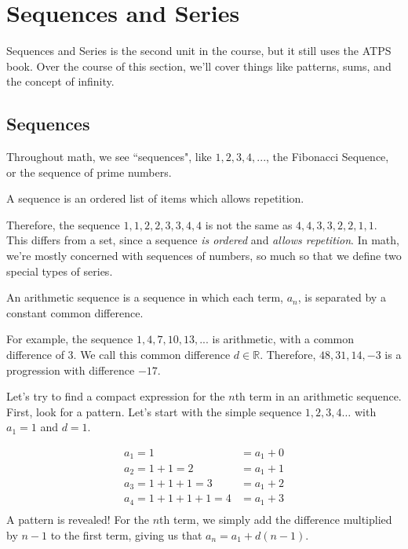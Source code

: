 \documentclass[11pt]{article}
\begin{document}
\newpage

\section{Sequences and Series}
Sequences and Series is the second unit in the course, but it still uses the ATPS book. Over the course of this section, we'll cover things like patterns, sums, and the concept of infinity.

\subsection{Sequences}
Throughout math, we see ``sequences", like $1,2,3,4,...$, the Fibonacci Sequence, or the sequence of prime numbers.

\begin{defn}
	A sequence is an ordered list of items which allows repetition.
\end{defn}
Therefore, the sequence $1,1,2,2,3,3,4,4$ is not the same as $4,4,3,3,2,2,1,1$. This differs from a set, since a sequence \textit{is ordered} and \textit{allows repetition}. In math, we're mostly concerned with sequences of numbers, so much so that we define two special types of series.

\begin{defn}
	An arithmetic sequence is a sequence in which each term, $a_n$, is separated by a constant common difference.
\end{defn}

For example, the sequence $1, 4, 7, 10, 13, ...$ is arithmetic, with a common difference of 3. We call this common difference $d \in \mathbb{R}.$ Therefore, $48, 31, 14, -3$ is a progression with difference $-17$.

Let's try to find a compact expression for the $n$th term in an arithmetic sequence. First, look for a pattern. Let's start with the simple sequence $1, 2, 3, 4\dots$ with $a_1 = 1$ and $d = 1$.

\begin{align*}
	a_1 = 1 &= a_1 + 0 \\
	a_2 = 1 + 1 = 2 &= a_1 + 1 \\
	a_3 = 1 + 1 + 1 = 3 &= a_1 + 2 \\
	a_4 = 1 + 1 + 1 + 1 = 4 &= a_1 + 3 \\
\end{align*}
A pattern is revealed! For the $n$th term, we simply add the difference multiplied by $n-1$ to the first term, giving us that $\boxed{a_n = a_1 + d(n-1)}$.
\end{document}
